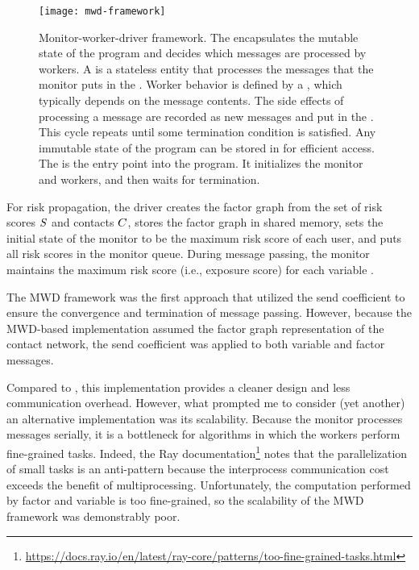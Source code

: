 \begin{figure}[htbp]
\centering
\texttt{[image: mwd-framework]}
\caption[Monitor-worker-driver framework]{Monitor-worker-driver framework. The  encapsulates the mutable state of the program and decides which messages are processed by workers. A  is a stateless entity that processes the messages that the monitor puts in the . Worker behavior is defined by a , which typically depends on the message contents. The side effects of processing a message are recorded as new messages and put in the . This cycle repeats until some termination condition is satisfied. Any immutable state of the program can be stored in  for efficient access. The  is the entry point into the program. It initializes the monitor and workers, and then waits for termination.}
\label{fig:mwd-framework}
\end{figure}

For risk propagation, the driver creates the factor graph from the set of risk scores $S$ and contacts $C$, stores the factor graph in shared memory, sets the initial state of the monitor to be the maximum risk score of each user, and puts all risk scores in the monitor queue. During message passing, the monitor maintains the maximum risk score (i.e., exposure score) for each variable \vertexName.

The MWD framework was the first approach that utilized the send coefficient to ensure the convergence and termination of message passing. However, because the MWD-based implementation assumed the factor graph representation of the contact network, the send coefficient was applied to both variable and factor messages.

Compared to , this implementation provides a cleaner design and less communication overhead. However, what prompted me to consider (yet another) an alternative implementation was its scalability. Because the monitor processes messages serially, it is a bottleneck for algorithms in which the workers perform fine-grained tasks. Indeed, the Ray documentation\footnote{\url{https://docs.ray.io/en/latest/ray-core/patterns/too-fine-grained-tasks.html}} notes that the parallelization of small tasks is an anti-pattern because the interprocess communication cost exceeds the benefit of multiprocessing. Unfortunately, the computation performed by factor \verticesName{} and variable \verticesName{} is too fine-grained, so the scalability of the MWD framework was demonstrably poor.

